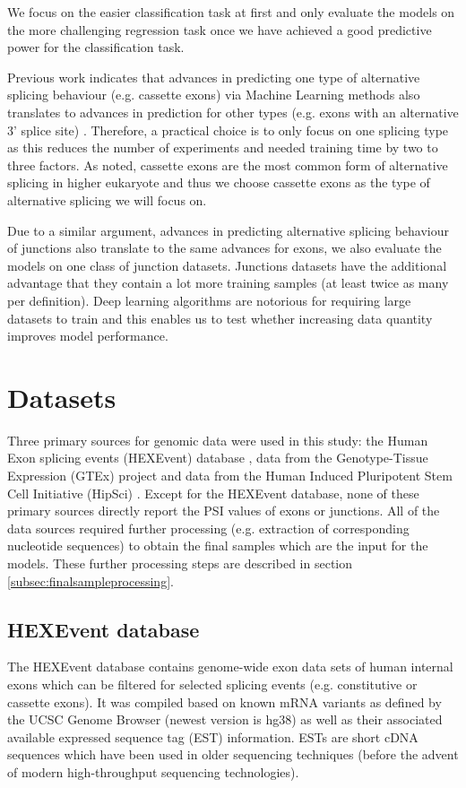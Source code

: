 We focus on the easier classification task at first and only evaluate the models on the more challenging regression task once we have achieved a good predictive power for the classification task. 


Previous work indicates that advances in predicting one type of alternative splicing behaviour (e.g. cassette exons) via Machine Learning methods also translates to advances in prediction for other types (e.g. exons with an alternative 3' splice site) \cite{dsc} \cite{buschhertel}. Therefore, a practical choice is to only focus on one splicing type as this reduces the number of experiments and needed training time by two to three factors. As noted, cassette exons are the most common form of alternative splicing in higher eukaryote and thus we choose cassette exons as the type of alternative splicing we will focus on.



Due to a similar argument, advances in predicting alternative splicing behaviour of junctions also translate to the same advances for exons, we also evaluate the models on one class of junction datasets. Junctions datasets have the additional advantage that they contain a lot more training samples (at least twice as many per definition). Deep learning algorithms are notorious for requiring large datasets to train and this enables us to test whether increasing data quantity improves model performance. 


\section{Datasets}\label{sec:datasets}
Three primary sources for genomic data were used in this study: the Human Exon splicing events (HEXEvent) database \cite{hexevent}, data from the Genotype-Tissue Expression (GTEx) project \cite{gtex} and data from the Human Induced Pluripotent Stem Cell Initiative (HipSci) \cite{hipsci}. Except for the HEXEvent database, none of these primary sources directly report the PSI values of exons or junctions. All of the data sources required further processing (e.g. extraction of corresponding nucleotide sequences) to obtain the final samples which are the input for the models. These further processing steps are described in section \ref{subsec:finalsampleprocessing}.


\subsection{HEXEvent database} \label{subsec:hexevent}
The HEXEvent database contains genome-wide exon data sets of human internal exons which can be filtered for selected splicing events (e.g. constitutive or cassette exons). It was compiled based on known mRNA variants as defined by the UCSC Genome Browser (newest version is hg38) as well as their associated available expressed sequence tag (EST) information. ESTs are short cDNA sequences which have been used in older sequencing techniques (before the advent of modern high-throughput sequencing technologies). 

